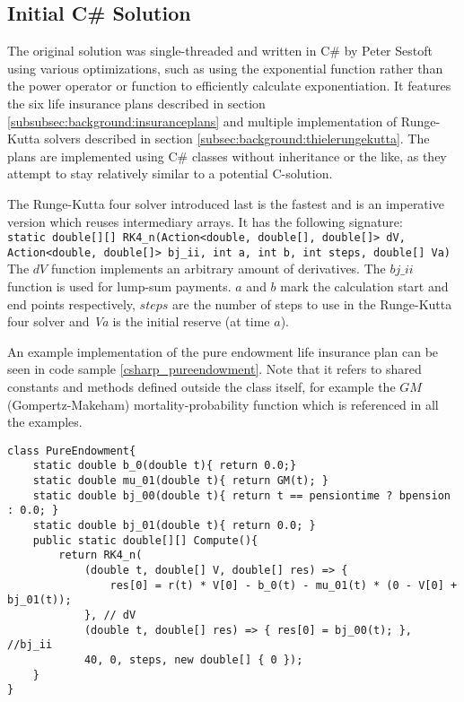 \subsection{Initial C\# Solution}\label{subsec:initialsolution}
The original solution was single-threaded and written in C\# by Peter Sestoft using various optimizations, such as using the exponential function rather than the power operator or function to efficiently calculate exponentiation.
It features the six life insurance plans described in section \ref{subsubsec:background:insuranceplans} and multiple implementation of Runge-Kutta solvers described in section \ref{subsec:background:thielerungekutta}.
The plans are implemented using C\# classes without inheritance or the like, as they attempt to stay relatively similar to a potential C-solution.

The Runge-Kutta four solver introduced last is the fastest and is an imperative version which reuses intermediary arrays.
It has the following signature: \\
\lstinline$static double[][] RK4_n(Action<double, double[], double[]> dV, Action<double, double[]> bj_ii, int a, int b, int steps, double[] Va)$
\\
The $dV$ function implements an arbitrary amount of derivatives.
The $bj\_ii$ function is used for lump-sum payments.
$a$ and $b$ mark the calculation start and end points respectively, $steps$ are the number of steps to use in the Runge-Kutta four solver and \textit{Va} is the initial reserve (at time $a$).

An example implementation of the pure endowment life insurance plan can be seen in code sample \ref{csharp_pureendowment}. 
Note that it refers to shared constants and methods defined outside the class itself, for example the $GM$ (Gompertz-Makeham) mortality-probability function which is referenced in all the examples.
\begin{lstlisting}[language=CSharp, caption=The pure endowment insurance plan expressed in C\#, label=csharp_pureendowment]
class PureEndowment{
    static double b_0(double t){ return 0.0;}
    static double mu_01(double t){ return GM(t); }
    static double bj_00(double t){ return t == pensiontime ? bpension : 0.0; }
    static double bj_01(double t){ return 0.0; }
    public static double[][] Compute(){
        return RK4_n(
            (double t, double[] V, double[] res) => { 
                res[0] = r(t) * V[0] - b_0(t) - mu_01(t) * (0 - V[0] + bj_01(t)); 
            }, // dV
            (double t, double[] res) => { res[0] = bj_00(t); }, //bj_ii
            40, 0, steps, new double[] { 0 });
    }
}
\end{lstlisting}

